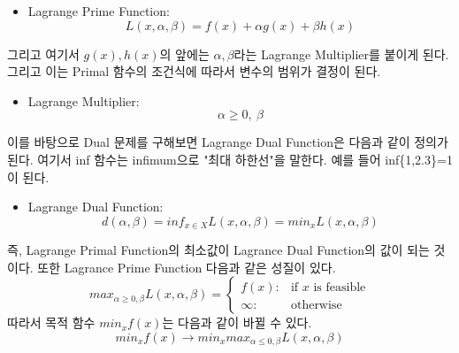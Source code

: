 \documentclass[a4paper]{oblivoir}
\begin{document}
\begin{itemize}\setlength\itemsep{-\parsep}
	\item Lagrange Prime Function:
	\begin{equation}
	L(x,\alpha,\beta)=f(x)+\alpha g(x)+\beta h(x)
	\label{eq:5-22}
	\end{equation}
\end{itemize}
그리고 여기서 $g(x),h(x)$의 앞에는 $\alpha,\beta$라는 Lagrange Multiplier를 붙이게 된다. 그리고 이는 Primal 함수의 조건식에 따라서 변수의 범위가 결정이 된다.
\begin{itemize}\setlength\itemsep{-\parsep}
	\item Lagrange Multiplier:
	\begin{equation}
	\alpha\geq 0,\ \beta
	\label{eq:5-23}
	\end{equation}
\end{itemize}
이를 바탕으로 Dual 문제를 구해보면 Lagrange Dual Function은 다음과 같이 정의가 된다. 여기서 inf 함수는 infimum으로 "최대 하한선"을 말한다. 예를 들어 inf\{1,2.3\}=1 이 된다.
\begin{itemize}\setlength\itemsep{-\parsep}
	\item Lagrange Dual Function:
	\begin{equation}
	d(\alpha,\beta)=inf_{x\in X} L(x,\alpha,\beta)=min_x L(x,\alpha,\beta)
	\label{eq:5-24}
	\end{equation}
\end{itemize}
즉, Lagrange Primal Function의 최소값이 Lagrance Dual Function의 값이 되는 것이다. 또한 Lagrance Prime Function 다음과 같은 성질이 있다.
\begin{equation}
max_{\alpha\geq0,\beta}L(x,\alpha,\beta)=
\begin{cases}
f(x):&\mbox{if }x\mbox{ is feasible}\\
\infty:&\mbox{otherwise}
\end{cases}
\label{eq:5-25}
\end{equation}
따라서 목적 함수 $min_x f(x)$는 다음과 같이 바뀔 수 있다.
$$min_x f(x)\rightarrow min_x max_{\alpha\leq 0,\beta} L(x,\alpha,\beta)$$\\

\end{document}
